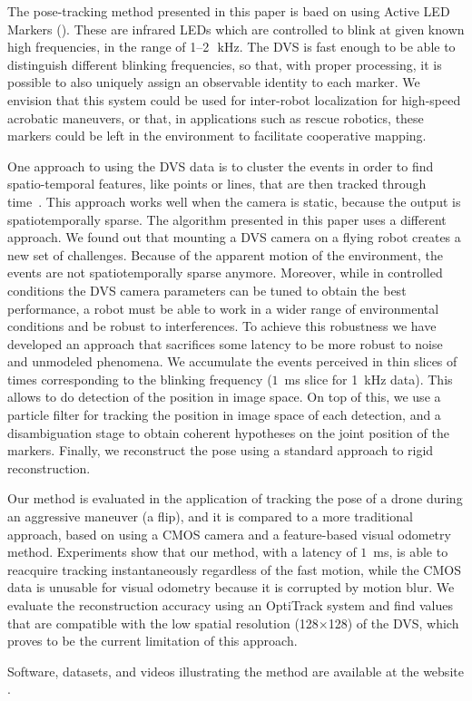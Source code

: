 The pose-tracking method presented in this paper is baed on using
Active LED Markers (\ALMs). These are infrared LEDs which are controlled
to blink at given known high frequencies, in the range of 1--2~$\,\mbox{kHz}$.
The DVS is fast enough to be able to distinguish different blinking
frequencies, so that, with proper processing, it is possible to also
uniquely assign an observable identity to each marker. We envision
that this system could be used for inter-robot localization for high-speed
acrobatic maneuvers, or that, in applications such as rescue robotics,
these markers could be left in the environment to facilitate cooperative
mapping.

One approach to using the DVS data is to cluster the events in order
to find spatio-temporal features, like points or lines, that are then
tracked through time~\cite{delbruck07fast,conradt09pencil,Matthias}.
This approach works well when the camera is static, because the output
is spatiotemporally sparse. The algorithm presented in this paper
uses a different approach. We found out that mounting a DVS camera
on a flying robot creates a new set of challenges. Because of the
apparent motion of the environment, the events are not spatiotemporally
sparse anymore. Moreover, while in controlled conditions the DVS camera
parameters can be tuned to obtain the best performance, a robot must
be able to work in a wider range of environmental conditions and be
robust to interferences. To achieve this robustness we have developed
an approach that sacrifices some latency to be more robust to noise
and unmodeled phenomena. We accumulate the events perceived in thin
slices of times corresponding to the blinking frequency ($1$~ms
slice for 1~kHz data). This allows to do detection of the \ALMs
position in image space. On top of this, we use a particle filter
for tracking the position in image space of each detection, and a
disambiguation stage to obtain coherent hypotheses on the joint position
of the markers. Finally, we reconstruct the pose using a standard
approach to rigid reconstruction.

Our method is evaluated in the application of tracking the pose of
a drone during an aggressive maneuver (a flip), and it is compared
to a more traditional approach, based on using a CMOS camera and a
feature-based visual odometry method. Experiments show that our method,
with a latency of $1$~ms, is able to reacquire tracking instantaneously
regardless of the fast motion, while the CMOS data is unusable for
visual odometry because it is corrupted by motion blur. We evaluate
the reconstruction accuracy using an OptiTrack system and find values
that are compatible with the low spatial resolution (128$\times$128)
of the DVS, which proves to be the current limitation of this approach.



Software, datasets, and videos illustrating the method are available
at the website \myurl.
